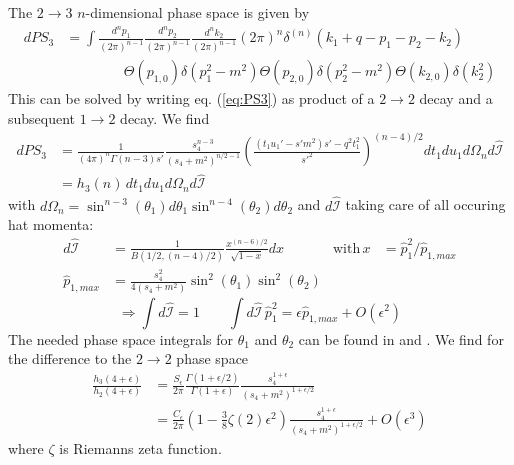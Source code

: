 The $2\rightarrow 3$ $n$-dimensional phase space is given by
\begin{align}
dPS_3 &= \!\int\!\!\frac{d^{n}p_1}{(2\pi)^{n-1}}\frac{d^{n}p_2}{(2\pi)^{n-1}}\frac{d^{n}k_2}{(2\pi)^{n-1}}(2\pi)^n\delta^{(n)}(k_1+q-p_1-p_2-k_2) \nonumber\\
 &\hspace{50pt}\Theta(p_{1,0})\delta(p_1^2-m^2)\Theta(p_{2,0})\delta(p_2^2-m^2)\Theta(k_{2,0})\delta(k_2^2) \label{eq:PS3}
\end{align}
This can be solved by writing eq. (\ref{eq:PS3}) as product of a $2\rightarrow 2$ decay and a subsequent $1\rightarrow 2$ decay\cite{PhysRevD4054}. We find
\begin{align}
dPS_3 &= \frac 1 {(4\pi)^n\Gamma(n-3)s'} \frac{s_4^{n-3}}{(s_4+m^2)^{n/2-1}}\left(\frac{(t_1u_1'-s'm^2)s' - q^2t_1^2}{s'^2}\right)^{(n-4)/2}\! dt_1 du_1 d\Omega_n d\hat{\mathcal I}\\
 &=h_3(n)\,dt_1 du_1 d\Omega_n d\hat{\mathcal I}
\end{align}
with $d\Omega_n = \sin^{n-3}(\theta_1)d\theta_1\sin^{n-4}(\theta_2)d\theta_2$ and $d\hat{\mathcal I}$ taking care of all occuring hat momenta:
\begin{align}
d\hat{\mathcal I} &= \frac 1 {B(1/2,(n-4)/2)}\frac{x^{(n-6)/2}}{\sqrt{1-x}}dx &\text{with}\,x &= \hat p_1^2/\hat p_{1,max}\\
\hat p_{1,max} &= \frac{s_4^2}{4(s_4+m^2)}\sin^2(\theta_1)\sin^2(\theta_2)
\end{align}
\begin{equation}
\Rightarrow \int\!d\hat{\mathcal I} = 1 \qquad \int\!d\hat{\mathcal I}\,\hat p_1^2 = \epsilon \hat p_{1,max} + O(\epsilon^2)
\end{equation}
The needed phase space integrals for $\theta_1$ and $\theta_2$ can be found in \cite{PhysRevD4054} and \cite{Bojak:2000eu}. We find for the difference to the $2\rightarrow 2$ phase space
\begin{align}
\frac{h_3(4+\epsilon)}{h_2(4+\epsilon)} &= \frac{S_\epsilon}{2\pi} \frac{\Gamma(1+\epsilon/2)}{\Gamma(1+\epsilon)} \frac{s_4^{1+\epsilon}}{(s_4+m^2)^{1+\epsilon/2}}\\
 &= \frac{C_\epsilon}{2\pi}\left(1-\frac 3 8 \zeta(2)\epsilon^2\right)\frac{s_4^{1+\epsilon}}{(s_4+m^2)^{1+\epsilon/2}} + O(\epsilon^3)
\end{align}
where $\zeta$ is Riemanns zeta function.

